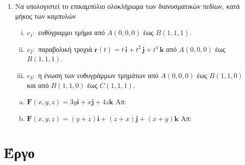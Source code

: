 \begin{center}
\minibox{\large\bfseries \textcolor{Col1}{Επικαμπύλιο Ολοκλήρωμα ΙΙου είδους}}
\end{center}

\vspace{\baselineskip}

\begin{enumerate}
  \item Να υπολογιστεί το επικαμπύλιο ολοκλήρωμα των διανυσματικών πεδίων, κατά μήκος των
    καμπυλών 
    \begin{enumerate}[i)]
      \item $ c_{1} \colon $ ευθύγραμμο τμήμα από $ A(0,0,0) $ έως $ B(1,1,1) $.
      \item $ c_{2} \colon $ παραβολική τροχιά $ \mathbf{r}(t)=t\, \mathbf{i} +
        t^{2}\, \mathbf{j} + t^{4} \, \mathbf{k} $ από $ A(0,0,0) $ έως $ B(1,1,1) $.
      \item $ c_{3} \colon $ η ένωση των ευθυγράμμων τμημάτων από 
        $ A(0,0,0) $ έως $ B(1,1,0) $ και από $ B(1,1,0) $ έως $ C(1,1,1) $.
    \end{enumerate}
    \begin{enumerate}[a)]
      \item $ \mathbf{F}(x,y,z) = 3y \mathbf{i} + x \mathbf{j} + 4z \mathbf{k}
        $ \hfill Απ: 
      \item $ \mathbf{F}(x,y,z) = (y+z) \mathbf{i} + (z+x) \mathbf{j} + (x+y) \mathbf{k}
        $ \hfill Απ: 
    \end{enumerate}

\end{enumerate}

\section*{Έργο}

